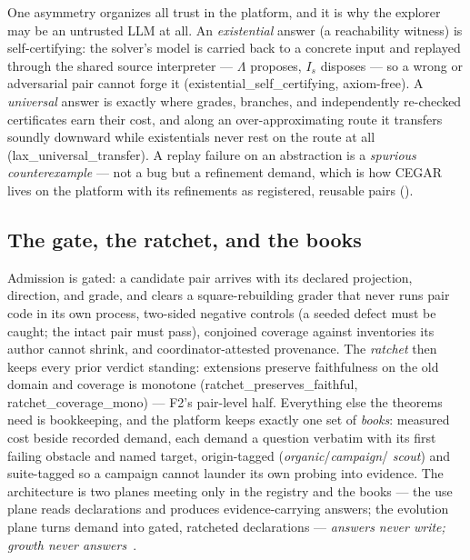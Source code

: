 One asymmetry organizes all trust in the platform, and it is why the
explorer may be an untrusted LLM at all. An \emph{existential} answer
(a reachability witness) is self-certifying: the solver's model is
carried back to a concrete input and replayed through the shared
source interpreter — $\Lambda$ proposes, $I_s$ disposes — so a wrong
or adversarial pair cannot forge it
(\textsf{existential\_self\_certifying}, axiom-free). A
\emph{universal} answer is exactly where grades, branches, and
independently re-checked certificates earn their cost, and along an
over-approximating route it transfers soundly downward while
existentials never rest on the route at all
(\textsf{lax\_universal\_transfer}). A replay failure on an
abstraction is a \emph{spurious counterexample} — not a bug but a
refinement demand, which is how CEGAR lives on the platform with its
refinements as registered, reusable pairs ().

\subsection{The gate, the ratchet, and the books}
\label{sec:inst-gate}

Admission is gated: a candidate pair arrives with its declared
projection, direction, and grade, and clears a square-rebuilding
grader that never runs pair code in its own process, two-sided
negative controls (a seeded defect must be caught; the intact pair
must pass), conjoined coverage against inventories its author cannot
shrink, and coordinator-attested provenance. The \emph{ratchet} then
keeps every prior verdict standing: extensions preserve faithfulness
on the old domain and coverage is monotone
(\textsf{ratchet\_preserves\_faithful},
\textsf{ratchet\_coverage\_mono}) — F2's pair-level half. Everything
else the theorems need is bookkeeping, and the platform keeps exactly
one set of \emph{books}: measured cost beside recorded demand, each
demand a question verbatim with its first failing obstacle and named
target, origin-tagged (\textit{organic}/\textit{campaign}/%
\textit{scout}) and suite-tagged so a campaign cannot launder its own
probing into evidence. The architecture is two planes meeting only in
the registry and the books — the use plane reads declarations and
produces evidence-carrying answers; the evolution plane turns demand
into gated, ratcheted declarations — \emph{answers never write;
growth never answers}~\citep{hurdygurdy2026calculus}.
